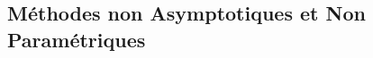 \documentclass[12pt]{article}
\newcommand{\espace}{\vspace{1.5em}}
\newcommand{\petitespace}{\vspace{0.5cm}}
\newcommand{\shift}{\hspace{2em}}
\newcommand{\bb}[1]{\mathbb{#1}} %
\newcommand{\R}{\bb{R}} %
\renewcommand{\P}{\bb{P}}%
\newcommand{\somme}[2]{\sum\limits_{#1}^{#2}}
\newcommand{\normale}[2]{\mathcal{N}(#1,#2)} %
\newcommand{\Xunan}{X_1,\ldots,X_n} %
\newcommand{\esp}[1]{\bb{ E} \mathopen{}\left[#1\right]} %
\newcommand{\modelstat}{\{ \P_\theta, \theta \in \Theta\}}
\newcommand{\1}{\bb{1}} %
\newcommand{\Xbarre}{\overline{X_n}}
\newcommand{\cvn}{\underset{n\rightarrow+\infty}{\longrightarrow}} %
\begin{document}
%
%
%
%
%
%
%
%
%
%
%
%
%
%
%
%
%


\subsection{Méthodes non Asymptotiques et Non Paramétriques}
\espace
\end{document}
